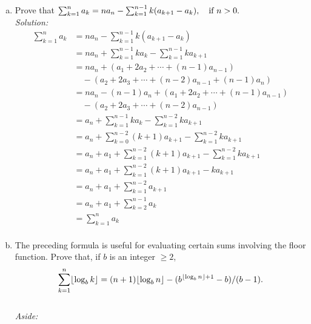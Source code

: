 \documentclass[fontsize=11pt, paper=a4]{scrartcl}
\DeclarePairedDelimiter\floor{\lfloor}{\rfloor}
\begin{document}
\begin{enumerate}[(a), leftmargin=1.5cm]
    
    \item Prove that $\sum_{k=1}^n a_{k} = na_{n} - \sum_{k=1}^{n-1} k(a_{k+1}-a_{k}), \quad \text{if\space} n > 0.$
        \enlargethispage{0.5cm}
        \vspace{0.5cm}
        \\\textit{Solution:}
        \begin{align*}
            \sum_{k=1}^{n} a_{k}
            &= na_{n} - \sum_{k=1}^{n-1} k(a_{k+1}-a_{k})\\
            &= na_{n} + \sum_{k=1}^{n-1} ka_{k} - \sum_{k=1}^{n-1}ka_{k+1}\\
            &= na_{n} + (a_{1} + 2a_{2} + \cdots + (n-1)a_{n-1})\\
            &\quad - (a_{2} + 2a_{3} + \cdots + (n-2)a_{n-1} + (n-1)a_{n})\\
            &= na_{n} - (n-1)a_{n} + (a_{1} + 2a_{2} + \cdots + (n-1)a_{n-1})\\
            &\quad - (a_{2} + 2a_{3} + \cdots + (n-2)a_{n-1})\\
            &= a_{n} + \sum_{k=1}^{n-1} ka_{k} - \sum_{k=1}^{n-2}ka_{k+1}\\
            &= a_{n} + \sum_{k=0}^{n-2} (k+1)a_{k+1} - \sum_{k=1}^{n-2}ka_{k+1}\\
            &= a_{n} + a_{1} + \sum_{k=1}^{n-2} (k+1)a_{k+1} - \sum_{k=1}^{n-2}ka_{k+1}\\
            &= a_{n} + a_{1} + \sum_{k=1}^{n-2} (k+1)a_{k+1} - ka_{k+1}\\
            &= a_{n} + a_{1} + \sum_{k=1}^{n-2} a_{k+1}\\
            &= a_{n} + a_{1} + \sum_{k=2}^{n-1} a_{k}\\
            &= \sum_{k=1}^{n} a_{k}\\
        \end{align*}
    \item The preceding formula is useful for evaluating certain sums involving the floor function. Prove that, if $b$ is an integer $\ge 2$,
        \begin{equation*}
            \sum_{k=1}^{n} \floor*{\log_b{k}} = (n+1) \floor*{\log_b{n}} - (b^{\floor*{\log_b{n}} + 1} - b) / (b-1).
        \end{equation*}
        \vspace{0.5em}
        \\\textit{Aside:}
        \begin{align*}

\end{align*}
\end{enumerate}
\end{document}
